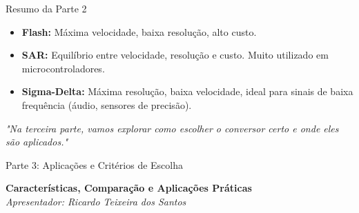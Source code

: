 \documentclass{beamer}
\begin{document}
\begin{frame}{Resumo da Parte 2}
    \begin{itemize}
        \item \textbf{Flash:} Máxima velocidade, baixa resolução, alto custo.
        \item \textbf{SAR:} Equilíbrio entre velocidade, resolução e custo. Muito utilizado em microcontroladores.
        \item \textbf{Sigma-Delta:} Máxima resolução, baixa velocidade, ideal para sinais de baixa frequência (áudio, sensores de precisão).
    \end{itemize}
    \vspace{0.5cm}
    \begin{center}
        \textit{"Na terceira parte, vamos explorar como escolher o conversor certo e onde eles são aplicados."}
    \end{center}
\end{frame}


\begin{frame}{Parte 3: Aplicações e Critérios de Escolha}
    \begin{center}
        \Large{\textbf{Características, Comparação e Aplicações Práticas}} \\
        \vspace{0.5cm}
        \textit{Apresentador: Ricardo Teixeira dos Santos}
    \end{center}
\end{frame}
\end{document}
